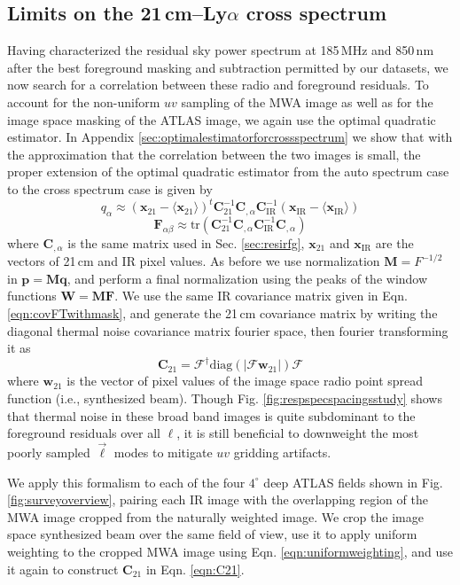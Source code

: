 \documentclass{emulateapj}
\newcommand{\IR}{\text{IR}}
\newcommand{\Fb}{\mathbf{F}}
\newcommand{\Mb}{\mathbf{M}}
\newcommand{\Cb}{\mathbf{C}}
\newcommand{\xb}{\mathbf{x}}
\newcommand{\pb}{\mathbf{p}}
\newcommand{\qb}{\mathbf{q}}
\newcommand{\Wb}{\mathbf{W}}
\begin{document}
\subsection{Limits on the 21\,cm--Ly$\alpha$ cross spectrum}

Having characterized the residual sky power spectrum at 185\,MHz and 850\,nm after the best foreground masking and subtraction permitted by our datasets, we now search for a correlation between these radio and foreground residuals. To account for the non-uniform $uv$ sampling of the MWA image as well as for the image space masking of the ATLAS image, we again use the optimal quadratic estimator. In Appendix \ref{sec:optimalestimatorforcrossspectrum} we show that with the approximation that the correlation between the two images is small, the proper extension of the optimal quadratic estimator from the auto spectrum case to the cross spectrum case is given by
\begin{equation}
q_\alpha \approx (\xb_{21}-\langle\xb_{21}\rangle)^t \Cb_{21}^{-1} \Cb_{,\alpha}\Cb_\IR^{-1}(\xb_\IR-\langle\xb_\IR\rangle)
\end{equation}
\begin{equation}
\Fb_{\alpha\beta}\approx\text{tr}\left(\Cb_{21}^{-1} \Cb_{,\alpha} \Cb_\IR^{-1}  \Cb_{,\alpha}  \right)	
\end{equation}
where $\Cb_{,\alpha}$ is the same matrix used in Sec. \ref{sec:resirfg}, $\mathbf{x}_{21}$ and $\mathbf{x}_{\IR}$ are the vectors of 21\,cm and IR pixel values. As before we use normalization $\Mb=F^{-1/2}$ in $\pb=\Mb\qb$, and perform a final normalization using the peaks of the window functions $\Wb=\Mb\Fb$. We use the same IR covariance matrix given in Eqn. \ref{eqn:covFTwithmask}, and generate the 21\,cm covariance matrix by writing the diagonal thermal noise covariance matrix fourier space, then fourier transforming it as
\begin{equation}
\label{eqn:C21}
\Cb_{21} = \mathcal{F}^\dagger\text{diag}(|\mathcal{F}\mathbf{w}_{21}|)\mathcal{F}
\end{equation}
where $\mathbf{w}_{21}$ is the vector of pixel values of the image space radio point spread function (i.e., synthesized beam). Though Fig. \ref{fig:respspecspacingsstudy} shows that thermal noise in these broad band images is quite subdominant to the foreground residuals over all $\ell$, it is still beneficial to downweight the most poorly sampled $\vec{\ell}$ modes to mitigate $uv$ gridding artifacts. 

We apply this formalism to each of the four $4^\circ$ deep ATLAS fields shown in Fig. \ref{fig:surveyoverview}, pairing each IR image with the overlapping region of the MWA image cropped from the naturally weighted image. We crop the image space synthesized beam over the same field of view, use it to apply uniform weighting to the cropped MWA image using Eqn. \ref{eqn:uniformweighting}, and use it again to construct $\Cb_{21}$ in Eqn. \ref{eqn:C21}. 
\end{document}
